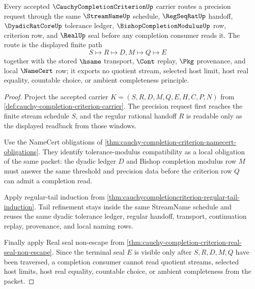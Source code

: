 \begin{theorem}
\label{thm:cauchy-completion-criterion-tail-modulus-criterion}
Every accepted $\CauchyCompletionCriterionUp$ carrier routes a precision request through the same $\StreamNameUp$ schedule, $\RegSeqRatUp$ handoff, $\DyadicRatCoreUp$ tolerance ledger, $\BishopCompletionModulusUp$ row, criterion row, and $\RealUp$ seal before any completion consumer reads it. The route is the displayed finite path
$$
S \longmapsto R \longmapsto D,M \longmapsto Q \longmapsto E
$$
together with the stored $\hsame$ transport, $\Cont$ replay, $\Pkg$ provenance, and local $\NameCert$ row; it exports no quotient stream, selected host limit, host real equality, countable choice, or ambient completeness principle.
\end{theorem}
\begin{proof}
Project the accepted carrier $K=(S,R,D,M,Q,E,H,C,P,N)$ from \autoref{def:cauchy-completion-criterion-carrier}. The precision request first reaches the finite stream schedule $S$, and the regular rational handoff $R$ is readable only as the displayed readback from those windows.

Use the NameCert obligations of \autoref{thm:cauchy-completion-criterion-namecert-obligations}. They identify tolerance-modulus compatibility as a local obligation of the same packet: the dyadic ledger $D$ and Bishop completion modulus row $M$ must answer the same threshold and precision data before the criterion row $Q$ can admit a completion read.

Apply regular-tail induction from \autoref{thm:cauchycompletioncriterion-regular-tail-induction}. Tail refinement stays inside the same StreamName schedule and reuses the same dyadic tolerance ledger, regular handoff, transport, continuation replay, provenance, and local naming rows.

Finally apply Real seal non-escape from \autoref{thm:cauchy-completion-criterion-real-seal-non-escape}. Since the terminal seal $E$ is visible only after $S,R,D,M,Q$ have been traversed, a completion consumer cannot read quotient streams, selected host limits, host real equality, countable choice, or ambient completeness from the packet.
\end{proof}


